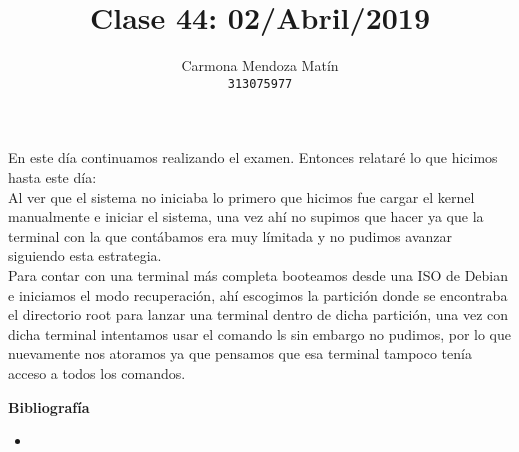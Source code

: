 \documentclass[11pt, a4paper]{report}
\begin{document}
\title{Clase 44: 02/Abril/2019}
\author{
  Carmona Mendoza Mat\'in\\
  \texttt{313075977}
}
\date{}
\maketitle

En este día continuamos realizando el examen. Entonces relataré lo que hicimos
hasta este día: \\

Al ver que el sistema no iniciaba lo primero que hicimos fue cargar el kernel
manualmente e iniciar el sistema, una vez ahí no supimos que hacer ya que la
terminal con la que contábamos era muy límitada y no pudimos avanzar siguiendo
esta estrategia. \\

Para contar con una terminal más completa booteamos desde una ISO de Debian e
iniciamos el modo recuperación, ahí escogimos la partición donde se encontraba
el directorio root para lanzar una terminal dentro de dicha partición, una vez
con dicha terminal intentamos usar el comando ls sin embargo no pudimos, por lo
que nuevamente nos atoramos ya que pensamos que esa terminal tampoco tenía
acceso a todos los comandos.



\newpage

\textbf{Bibliografía} \\

\begin{itemize}

\item \url{}
\end{itemize}
\end{document}
